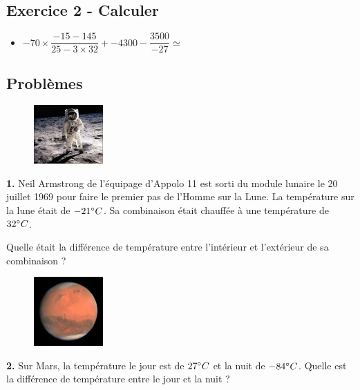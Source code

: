 \subsection*{Exercice 2 - Calculer}

\begin{itemize}[label={$\bullet$}]
        \item $-70 \times \dfrac{-15 - 145}{25 - 3 \times 32} + -4300 - \dfrac{3500}{-27} \simeq $ \dotfill
\end{itemize}


\subsection*{Problèmes}

\begin{minipage}[t]{0.25\textwidth}
  \begin{figure}[H]
    \centering
    \includegraphics[width=100px]{4x2-nombres-relatifs/ex1.jpg}
  \end{figure}
\end{minipage}
\begin{minipage}[t]{0.75\textwidth}
\textbf{1.} Neil Armstrong de l'équipage d'Appolo 11 est sorti du module lunaire le 20 juillet 1969 pour faire le premier pas de l'Homme sur la Lune. La température sur la lune était de $-21 \degree C$. Sa combinaison était chauffée à une température de $32 \degree C$. 

Quelle était la différence de température entre l'intérieur et l'extérieur de sa combinaison ? \\
\Pointilles[6]
\end{minipage}

\begin{minipage}[t]{0.25\textwidth}
  \begin{figure}[H]
    \centering
    \includegraphics[width=100px]{4x2-nombres-relatifs/ex4.jpg}
  \end{figure}
\end{minipage}
\begin{minipage}[t]{0.75\textwidth}
  \textbf{2.} Sur Mars, la température le jour est de $27\degree C$ et la nuit de $-84\degree C$. Quelle est la différence de température entre le jour et la nuit ?\\
  \Pointilles[6]
\end{minipage}

